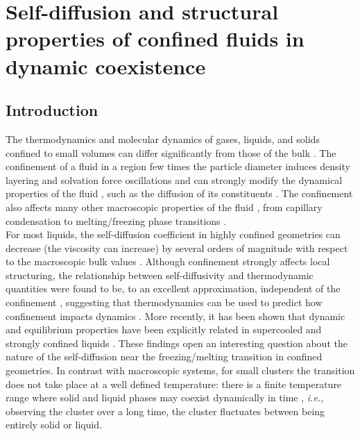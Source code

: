 \chapter{Self-diffusion and structural properties of confined fluids in dynamic coexistence\label{chap7}}

\section{Introduction}

The thermodynamics and molecular dynamics of gases, liquids, and solids confined to small volumes can differ significantly from those of the bulk \cite{Pawlow:1909,Hill:1963}. The confinement of a fluid in a region few times the particle diameter induces density layering and solvation force oscillations \cite{Hansen:2006,Israelachvili:1991,bhushan1995nanotribology} and can strongly modify the dynamical properties of the fluid \cite{Granick1991,Klein1995,Wales1996}, such as the diffusion of its constituents \cite{Erpenbeck:1991,Thompson1992,Gao1997,Mittal:2008,Matsubara:2012}. The confinement also affects many other macroscopic properties of the fluid \cite{Gelb:1999}, from capillary condensation \cite{evans1984theory,kober2010nanogeometry} to melting/freezing phase transitions \cite{briant1975molecular,Buffat:1976,berry1984melting,Honeycutt:1987,berry1988solid,ercolessi1991melting,schmidt1998irregular,Baletto2005}.\\
For most liquids, the self-diffusion coefficient in highly confined geometries can decrease (the viscosity can increase) by several orders of magnitude with respect to the macroscopic bulk values \cite{Granick1991,Klein1995,Erpenbeck:1991,Thompson1992,Gao1997,Mittal:2008,Matsubara:2012}. Although confinement strongly affects local structuring, the relationship between self-diffusivity and thermodynamic quantities were found to be, to an excellent approximation, independent of the confinement \cite{Mittal:2008,Mittal:2006}, suggesting that thermodynamics can be used to predict how confinement impacts dynamics \cite{Rosenfeld:1977}. More recently, it has been shown that dynamic and equilibrium properties have been explicitly related in supercooled and strongly confined liquids \cite{ingebrigtsen2013predicting}. These findings open an interesting question about the nature of the self-diffusion near the freezing/melting transition in confined geometries. In contrast with macroscopic systems, for small clusters the transition does not take place at a well defined temperature: there is a finite temperature range where solid and liquid phases may coexist dynamically in time \cite{briant1975molecular,berry1984melting,Honeycutt:1987,berry1988solid,Labastie1990,Wales1994,Cleveland1994,schebarchov2005static}, {\it i.e.}, observing the cluster over a long time, the cluster fluctuates between being entirely solid or liquid.\\ 

